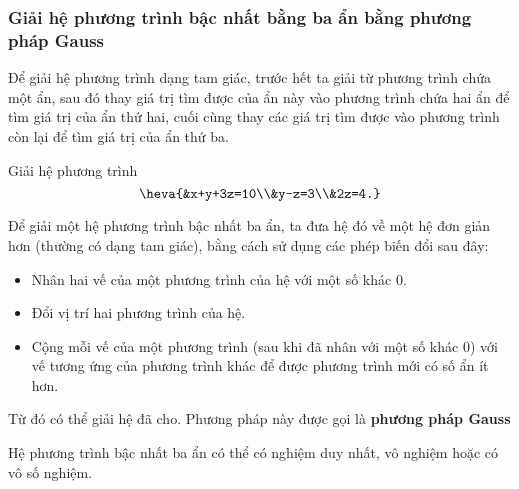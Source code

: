 \subsubsection{Giải hệ phương trình bậc nhất bằng ba ẩn bằng phương pháp Gauss}
\begin{tomtat}
	Để giải hệ phương trình dạng tam giác, trước hết ta giải từ phương trình chứa một ẩn, sau đó thay giá trị tìm được của ẩn này vào phương trình chứa hai ẩn để tìm giá trị của ẩn thứ hai, cuối cùng thay các giá trị tìm được vào phương trình còn lại để tìm giá trị của ẩn thứ ba.
\end{tomtat}
\begin{vd}
	Giải hệ phương trình 
	\[\heva{&x+y+3z=10\\&y-z=3\\&2z=4.}\]
\end{vd}
\begin{tomtat}
	Để giải một hệ phương trình bậc nhất ba ẩn, ta đưa hệ đó về một hệ đơn giản hơn (thường có dạng tam giác), bằng cách sử dụng các phép biến đổi sau đây:
	\begin{itemize}
		\item Nhân hai vế của một phương trình của hệ với một số khác $0$.
		\item Đổi vị trí hai phương trình của hệ.
		\item Cộng mỗi vế của một phương trình (sau khi đã nhân với một số khác $0$) với vế tương ứng của phương trình khác để được phương trình mới có số ẩn ít hơn.
	\end{itemize}
Từ đó có thể giải hệ đã cho. Phương pháp này được gọi là \textbf{phương pháp Gauss}
\begin{nx}
	Hệ phương trình bậc nhất ba ẩn có thể có nghiệm duy nhất, vô nghiệm hoặc có vô số nghiệm.
\end{nx}
\end{tomtat}

